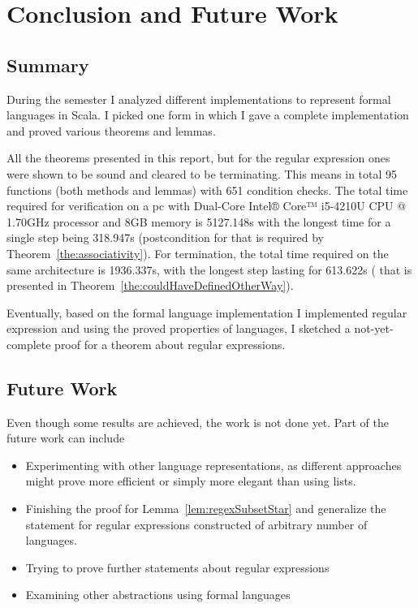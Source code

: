 \section{Conclusion and Future Work}

\subsection{Summary}

During the semester I analyzed different implementations to represent formal languages in Scala. I picked one form in which I gave a complete implementation and proved various theorems and lemmas. 

All the theorems presented in this report, but for the regular expression ones were shown to be sound and cleared to be terminating. This means in total 95 functions (both methods and lemmas) with 651 condition checks. The total time required for verification on a pc with Dual-Core Intel® Core™ i5-4210U CPU @ 1.70GHz processor and 8GB memory is 5127.148s with the longest time for a single step being 318.947s (postcondition for  that is required by Theorem~\ref{the:associativity}). For termination, the total time required on the same architecture is 1936.337s, with the longest step lasting for 613.622s ( that is presented in Theorem~\ref{the:couldHaveDefinedOtherWay}).

Eventually, based on the formal language implementation I implemented regular expression and using the proved properties of languages, I sketched a not-yet-complete proof for a theorem about regular expressions.

\subsection{Future Work}

Even though some results are achieved, the work is not done yet. Part of the future work can include
\begin{itemize}
	\item Experimenting with other language representations, as different approaches might prove more efficient or simply more elegant than using lists.
	\item Finishing the proof for Lemma~\ref{lem:regexSubsetStar} and generalize the statement for regular expressions constructed of arbitrary number of languages.
	\item Trying to prove further statements about regular expressions
	\item Examining other abstractions using formal languages
\end{itemize}